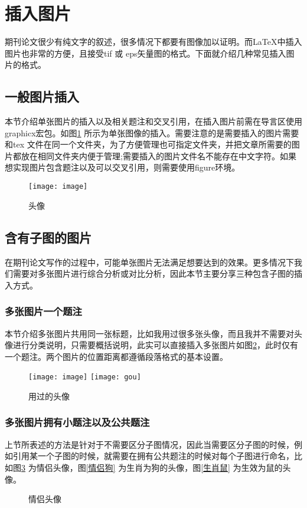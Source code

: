 \section{插入图片}
期刊论文很少有纯文字的叙述，很多情况下都要有图像加以证明。而\LaTeX 中插入图片也非常的方便，且接受tif 或 eps矢量图的格式。下面就介绍几种常见插入图片的格式。

\subsection{一般图片插入}
本节介绍单张图片的插入以及相关题注和交叉引用，在插入图片前需在导言区使用graphicx宏包。如图\ref{头像}
所示为单张图像的插入。需要注意的是需要插入的图片需要和tex 文件在同一个文件夹，为了方便管理也可指定文件夹，并把文章所需要的图片都放在相同文件夹内便于管理;需要插入的图片文件名不能存在中文字符。如果想实现图片包含题注以及可以交叉引用，则需要使用figure环境。

\begin{figure}[htbp]
	\centering
	\texttt{[image: image]}	%
	\caption{头像}
	\label{头像}
\end{figure}

\subsection{含有子图的图片}
在期刊论文写作的过程中，可能单张图片无法满足想要达到的效果。更多情况下我们需要对多张图片进行综合分析或对比分析，因此本节主要分享三种包含子图的插入方式。
\subsubsection{多张图片一个题注}
本节介绍多张图片共用同一张标题，比如我用过很多张头像，而且我并不需要对头像进行分类说明，只需要概括说明，此实可以直接插入多张图片如图\ref{用过的头像}，此时仅有一个题注。两个图片的位置距离都遵循段落格式的基本设置。

\begin{figure}[htbp]
	\centering
	\texttt{[image: image]} \hspace{1cm}	%
	\texttt{[image: gou]}
	\caption{用过的头像}
	\label{用过的头像}
\end{figure}
\subsubsection{多张图片拥有小题注以及公共题注}
上节所表述的方法是针对于不需要区分子图情况，因此当需要区分子图的时候，例如引用某一个子图的时候，就需要在拥有公共题注的时候对每个子图进行命名，比如图\ref{情侣头像}
为情侣头像，图\ref{情侣狗}
为生肖为狗的头像，图\ref{生肖鼠}
为生效为鼠的头像。
\begin{figure}[htbp]
	\centering
	 \quad
	\caption{情侣头像}
	\label{情侣头像}
\end{figure}
